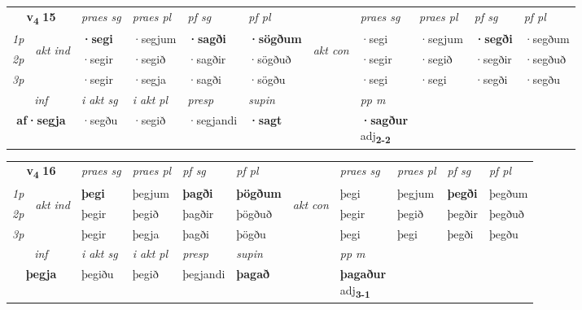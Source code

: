 \noindent
\begin{tabular}{lllllllllll} \toprule
\multicolumn{2}{c}{\textbf{v{\textsubscript{4}}} \Large{\textbf{15}}}  &  \textit{praes sg}  & \textit{praes pl}  &\textit{ pf sg} & \textit{pf pl} &  &  \textit{praes sg}  & \textit{praes pl}  & \textit{pf sg} & \textit{pf pl } \\*
	\cmidrule{3-6} \cmidrule{8-11}
 {\textit{1p}} & \multirow{3}{*}{\begin{turn}{90}\textit{akt ind}\end{turn}} & \textbf{·segi} & ·segjum & \textbf{·sagði} & \textbf{·sögðum} & \multirow{3}{*}{\begin{turn}{90}\textit{akt con}\end{turn}} &·segi & ·segjum & \textbf{·segði} & ·segðum\\*
 {\textit{2p}} &  &  ·segir  & ·segið & ·sagðir & ·sögðuð & & ·segir & ·segið & ·segðir & ·segðuð \\*
{\textit{3p}} &  & ·segir & ·segja & ·sagði & ·sögðu & & ·segi & ·segi& ·segði & ·segðu \\*
\cmidrule{3-6} \cmidrule{8-11}

   \multicolumn{2}{c}{\textit{inf}}  & \textit{i akt sg} & \textit{i akt pl}   & \textit{presp} & \textit{supin}  && \textit{pp m} \\*
  \multicolumn{2}{c}{\textbf{af\allowbreak ·segja}} & ·segðu  & ·segið   & ·segjandi &  \textbf{·sagt}  && \specialcell{\textbf{·sagður} \\ adj\textbf{\textsubscript{2-2}}} \\*
\end{tabular}

\noindent
\begin{tabular}{lllllllllll} \toprule
\multicolumn{2}{c}{\textbf{v{\textsubscript{4}}} \Large{\textbf{16}}}  &  \textit{praes sg}  & \textit{praes pl}  &\textit{ pf sg} & \textit{pf pl} &  &  \textit{praes sg}  & \textit{praes pl}  & \textit{pf sg} & \textit{pf pl } \\*
	\cmidrule{3-6} \cmidrule{8-11}
 {\textit{1p}} & \multirow{3}{*}{\begin{turn}{90}\textit{akt ind}\end{turn}} & \textbf{þegi} & þegjum & \textbf{þagði} & \textbf{þögðum} & \multirow{3}{*}{\begin{turn}{90}\textit{akt con}\end{turn}} &þegi & þegjum & \textbf{þegði} & þegðum\\*
 {\textit{2p}} &  &  þegir  & þegið & þagðir & þögðuð & & þegir & þegið & þegðir & þegðuð \\*
{\textit{3p}} &  & þegir & þegja & þagði & þögðu & & þegi & þegi& þegði & þegðu \\*
\cmidrule{3-6} \cmidrule{8-11}

   \multicolumn{2}{c}{\textit{inf}}  & \textit{i akt sg} & \textit{i akt pl}   & \textit{presp} & \textit{supin}  && \textit{pp m} \\*
  \multicolumn{2}{c}{\textbf{þegja}} & þegiðu  & þegið   & þegjandi &  \textbf{þagað}  && \specialcell{\textbf{þagaður} \\ adj\textbf{\textsubscript{3-1}}} \\*
\end{tabular}

